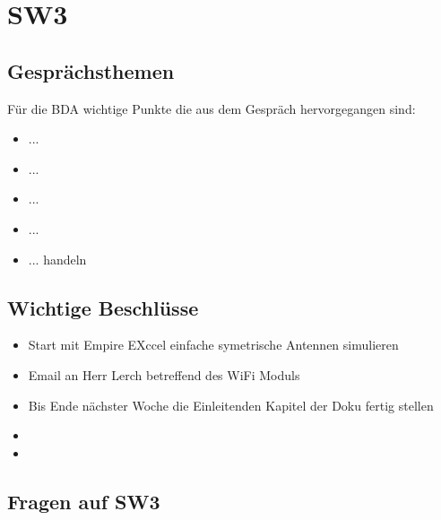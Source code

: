 \documentclass[10pt,a4paper]{article}
\begin{document}
\section{SW3}

\subsection{Gesprächsthemen}



Für die BDA wichtige Punkte die aus dem Gespräch hervorgegangen sind:
\begin{itemize}
	\item ...
	\item ... 
	\item ... 
	\item ...
	\item ...
 handeln
\end{itemize}

\subsection{Wichtige Beschlüsse}

\begin{itemize}
	\item Start mit Empire EXccel einfache symetrische Antennen simulieren
	\item Email an Herr Lerch betreffend des WiFi Moduls
	\item Bis Ende nächster Woche die Einleitenden Kapitel der Doku fertig stellen
	\item 
	\item 
\end{itemize}

\subsection{Fragen auf SW3}
\end{document}
